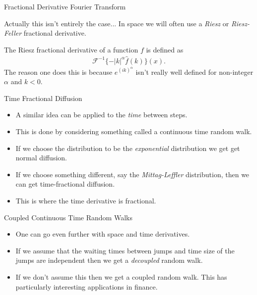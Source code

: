 \documentclass[pdf]{beamer}
\begin{document}
\begin{frame}{Fractional Derivative Fourier Transform}

    Actually this isn't entirely the case...
    In space we will often use a \emph{Riesz} or \emph{Riesz-Feller} fractional derivative. 
    
    The Riesz fractional derivative of a function $ f $ is defined as 
    \begin{align}
        \mathcal{F}^{-1}\{-|k|^\alpha \hat{f}(k) \}(x).
    \end{align}
    The reason one does this is because $ e^{(ik)^\alpha} $ isn't really well defined for non-integer $ \alpha $ and $ k < 0 $. 
\end{frame}

\begin{frame}{Time Fractional Diffusion}
    \begin{itemize}
        \item A similar idea can be applied to the \emph{time} between steps. 
        \item This is done by considering something called a continuous time random walk.
        \item If we choose the distribution to be the \emph{exponential} distribution we get get normal diffusion.
        \item If we choose something different, say the \emph{Mittag-Leffler} distribution, then we can get time-fractional diffusion.
        \item This is where the time derivative is fractional.
    \end{itemize}
\end{frame}
	

\begin{frame}{Coupled Continuous Time Random Walks}
    \begin{itemize}
        \item One can go even further with space and time derivatives. 
        \item If we assume that the waiting times between jumps and time size of the jumps are independent then we get a \emph{decoupled} random walk.
        \item If we don't assume this then we get a coupled random walk. This has particularly interesting applications in finance.
    \end{itemize}
\end{frame}
\end{document}

